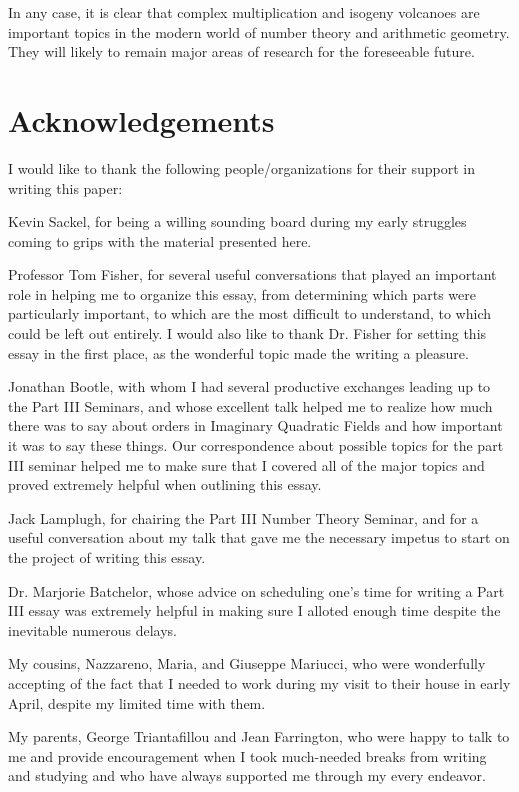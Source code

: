 \documentclass{amsart}
\theoremstyle{definition}
\theoremstyle{remark}
\numberwithin{equation}{section}
\begin{document}
 In any case, it is clear that complex multiplication and isogeny volcanoes are important topics in the modern world of number theory and arithmetic geometry. They will likely to remain major areas of research for the foreseeable future.

\section{Acknowledgements}

I would like to thank the following people/organizations for their support in writing this paper:

Kevin Sackel, for being a willing sounding board during my early struggles coming to grips with the material presented here.

Professor Tom Fisher, for several useful conversations that played an important role in helping me to organize this essay, from determining which parts were particularly important, to which are the most difficult to understand, to which could be left out entirely. I would also like to thank Dr. Fisher for setting this essay in the first place, as the wonderful topic made the writing a pleasure.

Jonathan Bootle, with whom I had several productive exchanges leading up to the Part III Seminars, and whose excellent talk helped me to realize how much there was to say about orders in Imaginary Quadratic Fields and how important it was to say these things. Our correspondence about possible topics for the part III seminar helped me to make sure that I covered all of the major topics and proved extremely helpful when outlining this essay.

Jack Lamplugh, for chairing the Part III Number Theory Seminar, and for a useful conversation about my talk that gave me the necessary impetus to start on the project of writing this essay.

Dr. Marjorie Batchelor, whose advice on scheduling one's time for writing a Part III essay was extremely helpful in making sure I alloted enough time despite the inevitable numerous delays.

My cousins, Nazzareno, Maria, and Giuseppe Mariucci, 
who were wonderfully accepting of the fact that I needed to work during my visit to their house in early April, despite my limited time with them.

My parents, George Triantafillou and Jean Farrington, 
who were happy to talk to me and provide encouragement when I took much-needed breaks from writing and studying and who have always supported me through my every endeavor.
\end{document}
